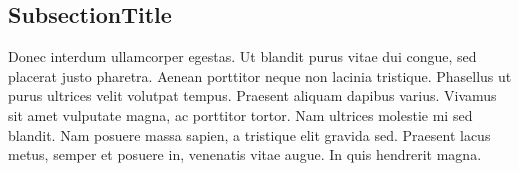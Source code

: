 \subsection{SubsectionTitle}
Donec interdum ullamcorper egestas. Ut blandit purus vitae dui congue, sed placerat justo pharetra. Aenean porttitor neque non lacinia tristique. Phasellus ut purus ultrices velit volutpat tempus. Praesent aliquam dapibus varius. Vivamus sit amet vulputate magna, ac porttitor tortor. Nam ultrices molestie mi sed blandit. Nam posuere massa sapien, a tristique elit gravida sed. Praesent lacus metus, semper et posuere in, venenatis vitae augue. In quis hendrerit magna. 